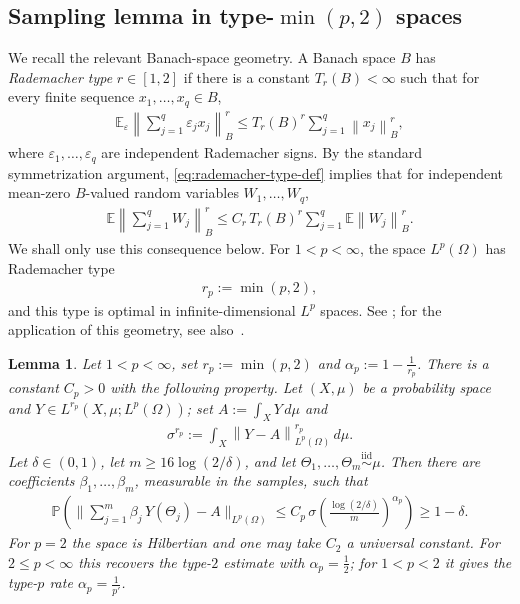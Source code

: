 \documentclass[12pt]{article}
\numberwithin{equation}{section}
\newtheorem{lemma}{Lemma}[section]
\numberwithin{figure}{section}
\numberwithin{equation}{section}
\newcommand{\norm}[1]{\left\|#1\right\|}
\begin{document}
\subsection{Sampling lemma in type-\texorpdfstring{$\min(p,2)$}{min(p,2)} spaces}
We recall the relevant Banach-space geometry. A Banach space $B$ has
\emph{Rademacher type} $r\in[1,2]$ if there is a constant $T_r(B)<\infty$ such
that for every finite sequence $x_1,\dots,x_q\in B$,
\begin{align}
    \mathbb E_\varepsilon
    \norm{\sum_{j=1}^q \varepsilon_j x_j}_B^r
    \le
    T_r(B)^r\sum_{j=1}^q\norm{x_j}_B^r,
    \label{eq:rademacher-type-def}
\end{align}
where $\varepsilon_1,\dots,\varepsilon_q$ are independent Rademacher signs. By the
standard symmetrization argument, \eqref{eq:rademacher-type-def} implies that for
independent mean-zero $B$-valued random variables $W_1,\dots,W_q$,
\begin{align}
    \mathbb E\norm{\sum_{j=1}^q W_j}_B^r
    \le
    C_r\,T_r(B)^r\sum_{j=1}^q\mathbb E\norm{W_j}_B^r .
    \label{eq:type-r-independent}
\end{align}
We shall only use this consequence below. For $1<p<\infty$, the space
$L^p(\Omega)$ has Rademacher type
\begin{align}
    r_p:=\min(p,2),
    \label{eq:lp-type-rp}
\end{align}
and this type is optimal in infinite-dimensional $L^p$ spaces. See
\cite[Chapter 6]{albiac_TopicsBanachSpace_2006}; for the application of
this geometry, see also~\cite{siegel_sharpboundsapproximation_2024}.

\begin{lemma}
\label{lem:high-prob-uniform-hilbert}
Let $1<p<\infty$, set $r_p:=\min(p,2)$ and
$\alpha_p:=1-\tfrac1{r_p}$. There is a constant $C_p>0$ with the following
property. Let $(X,\mu)$ be a probability space and
$Y\in L^{r_p}(X,\mu;L^p(\Omega))$; set
$A:=\int_X Y\,d\mu$ and
\begin{align*}
    \sigma^{r_p}:=\int_X\norm{Y-A}_{L^p(\Omega)}^{r_p}\,d\mu.
\end{align*}
Let $\delta\in(0,1)$, let $m\ge16\log(2/\delta)$, and let
$\Theta_1,\dots,\Theta_m\overset{\mathrm{iid}}\sim\mu$. Then there are
coefficients $\beta_1,\dots,\beta_m$, measurable in the samples, such that
\begin{align}
    \mathbb P\left(
    \Big\|\sum_{j=1}^m\beta_j\,Y(\Theta_j)-A\Big\|_{L^p(\Omega)}
    \le C_p\,\sigma
    \left(\frac{\log(2/\delta)}{m}\right)^{\alpha_p}
    \right)\ge1-\delta.
    \label{eq:type2-sampling}
\end{align}
For $p=2$ the space is Hilbertian and one may take $C_2$ a universal constant.
For $2\le p<\infty$ this recovers the type-$2$ estimate with
$\alpha_p=\tfrac12$; for $1<p<2$ it gives the type-$p$ rate
$\alpha_p=\tfrac1{p'}$.
\end{lemma}
\end{document}
